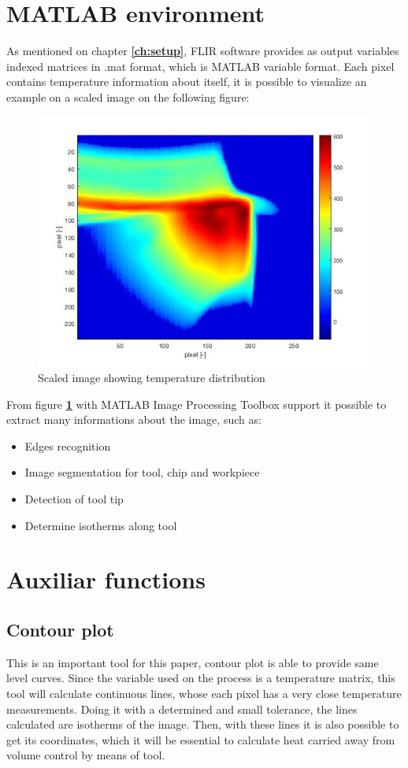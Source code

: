 \section{MATLAB environment}
	As mentioned on chapter \textbf{\ref{ch:setup}}, FLIR software provides as output variables indexed matrices in .mat format, which is MATLAB variable format. Each pixel contains temperature information about itself, it is possible to visualize an example on a scaled image on the following figure:

	\begin{figure}[H]
		\centering
		\captionsetup{justification=centering}
		\includegraphics[width=0.9\linewidth]{Cap4/TempDist.jpg}
		\caption{Scaled image showing temperature distribution}
		\label{fig:tempdist}
	\end{figure}

	From figure \textbf{\ref{fig:tempdist}} with MATLAB Image Processing Toolbox support it possible to extract many informations about the image, such as:

	\begin{itemize}
		\item Edges recognition
		\item Image segmentation for tool, chip and workpiece
		\item Detection of tool tip
		\item Determine isotherms along tool
	\end{itemize}
	
\section{Auxiliar functions}
	\subsection{Contour plot}
	\label{ch:seccontour}
	This is an important tool for this paper, contour plot is able to provide same level curves. Since the variable used on the process is a temperature matrix, this tool will calculate continuous lines, whose each pixel has a very close temperature measurements. Doing it with a determined and small tolerance, the lines calculated are isotherms of the image. Then, with these lines it is also possible to get its coordinates, which it will be essential to calculate heat carried away from volume control by means of tool.

